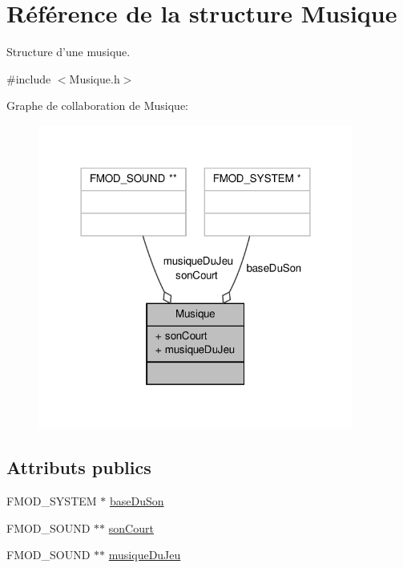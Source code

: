 \hypertarget{structMusique}{\section{Référence de la structure Musique}
\label{structMusique}
}


Structure d'une musique.  




{\ttfamily \#include $<$Musique.\-h$>$}



Graphe de collaboration de Musique\-:
\nopagebreak
\begin{figure}[H]
\begin{center}
\leavevmode
\includegraphics[width=294pt]{structMusique__coll__graph}
\end{center}
\end{figure}
\subsection*{Attributs publics}
\begin{DoxyCompactItemize}
\item 
F\-M\-O\-D\-\_\-\-S\-Y\-S\-T\-E\-M $\ast$ \hyperlink{structMusique_a5ac7591cc431a2ef548d48e9cf858d94}{base\-Du\-Son}
\item 
F\-M\-O\-D\-\_\-\-S\-O\-U\-N\-D $\ast$$\ast$ \hyperlink{structMusique_ae957f32de4befa0f625f4b7229e3d660}{son\-Court}
\item 
F\-M\-O\-D\-\_\-\-S\-O\-U\-N\-D $\ast$$\ast$ \hyperlink{structMusique_a442e0e2e689699e3bb72eb8c8e4e14c2}{musique\-Du\-Jeu}
\end{DoxyCompactItemize}


